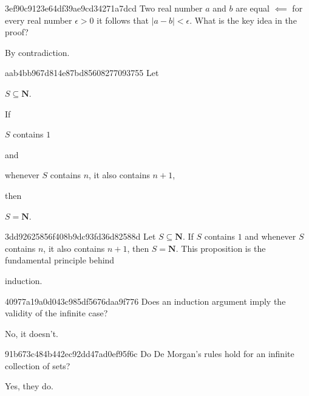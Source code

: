 \begin{note}{3ef90c9123e64df39ae9cd34271a7dcd}
    Two real number \({ a }\) and \({ b }\) are equal \({ \impliedby }\) for every real number \({ \epsilon > 0 }\) it follows that \({ \left\lvert a - b \right\rvert < \epsilon }\).
    What is the key idea in the proof?

    \begin{cloze}{1}
        By contradiction.
    \end{cloze}
\end{note}

\begin{note}{aab4bb967d814e87bd85608277093755}
    Let \begin{icloze}{3}\({ S \subseteq \mathbf{N} }\).\end{icloze}
    If \begin{icloze}{2}\({ S }\) contains \({ 1 }\)\end{icloze} and \begin{icloze}{2}whenever \({ S }\) contains \({ n }\), it also contains \({ n + 1 }\),\end{icloze} then \begin{icloze}{1}\({ S = \mathbf{N} }\).\end{icloze}
\end{note}

\begin{note}{3dd92625856f408b9dc93fd36d82588d}
    Let \({ S \subseteq \mathbf{N} }\).
    If \({ S }\) contains \({ 1 }\) and whenever \({ S }\) contains \({ n }\), it also contains \({ n + 1 }\), then \({ S = \mathbf{N} }\).
    This proposition is the fundamental principle behind \begin{icloze}{1}induction.\end{icloze}
\end{note}

\begin{note}{40977a19a0d043c985df5676daa9f776}
    Does an induction argument imply the validity of the infinite case?

    \begin{cloze}{1}
        No, it doesn't.
    \end{cloze}
\end{note}

\begin{note}{91b673c484b442ec92dd47ad0ef95f6c}
    Do De Morgan's rules hold for an infinite collection of sets?

    \begin{cloze}{1}
        Yes, they do.
    \end{cloze}
\end{note}

